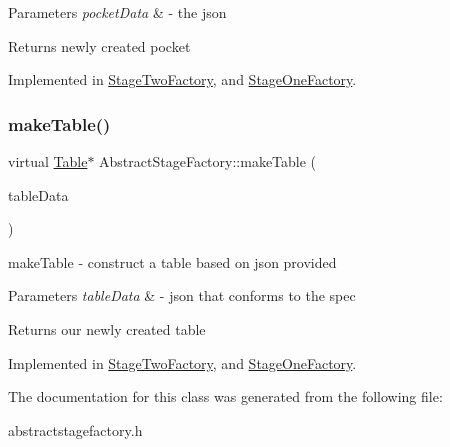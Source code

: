\begin{DoxyParams}{Parameters}
{\em pocket\+Data} & -\/ the json \\
\hline
\end{DoxyParams}
\begin{DoxyReturn}{Returns}
newly created pocket 
\end{DoxyReturn}


Implemented in \mbox{\hyperlink{class_stage_two_factory_a6b66c413691103cf5df2840bcdb683ef}{Stage\+Two\+Factory}}, and \mbox{\hyperlink{class_stage_one_factory_ab9d7b7d74b61a2fd6c96562a67dc2fe8}{Stage\+One\+Factory}}.

\mbox{\label{class_abstract_stage_factory_a539c855ce9a09e08b7fcb3ffa7f0d3fd}} 
\subsubsection{\texorpdfstring{make\+Table()}{makeTable()}}
{\footnotesize\ttfamily virtual \mbox{\hyperlink{class_table}{Table}}$\ast$ Abstract\+Stage\+Factory\+::make\+Table (\begin{DoxyParamCaption}\item[{const Q\+Json\+Object \&}]{table\+Data }\end{DoxyParamCaption})\hspace{0.3cm}{\ttfamily [pure virtual]}}



make\+Table -\/ construct a table based on json provided 


\begin{DoxyParams}{Parameters}
{\em table\+Data} & -\/ json that conforms to the spec \\
\hline
\end{DoxyParams}
\begin{DoxyReturn}{Returns}
our newly created table 
\end{DoxyReturn}


Implemented in \mbox{\hyperlink{class_stage_two_factory_aa532818e02bed0ea1f5c79a1a1487e71}{Stage\+Two\+Factory}}, and \mbox{\hyperlink{class_stage_one_factory_a31e02c98e5c428f0e1ac0a36e641310d}{Stage\+One\+Factory}}.



The documentation for this class was generated from the following file\+:\begin{DoxyCompactItemize}
\item 
abstractstagefactory.\+h\end{DoxyCompactItemize}
